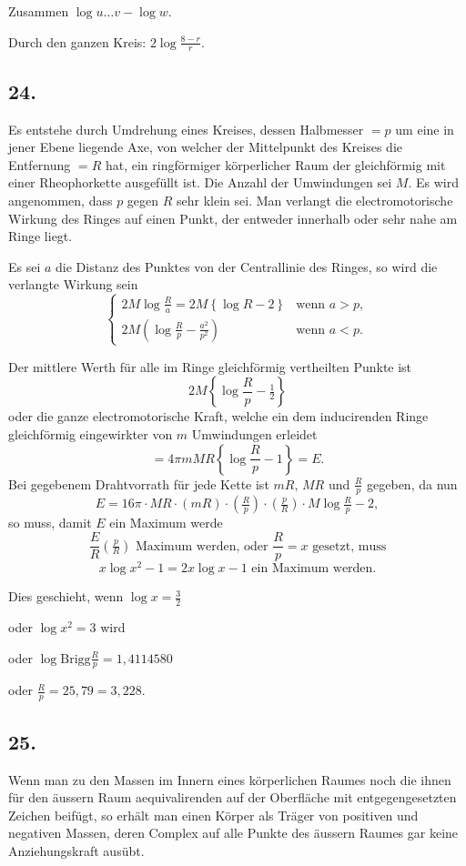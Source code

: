 \documentclass[fontsize=10pt,paper=a5,pagesize=auto]{scrbook}
\newcommand{\origpage}[1]{\marginpar{\footnotesize\textit{S. #1}}}
\begin{document}
Zusammen $\log u \dots v - \log w$.

Durch den ganzen Kreis: $2\log \frac{8 - r}{r}$.

\subsection*{24.}
\origpage{625}
Es entstehe durch Umdrehung eines Kreises, dessen Halbmesser $= p$ um eine in jener Ebene liegende Axe, von welcher der Mittelpunkt des Kreises die Entfernung $= R$ hat, ein ringförmiger körperlicher Raum der gleichförmig mit einer Rheophorkette ausgefüllt ist. Die Anzahl der Umwindungen sei $M$. Es wird angenommen, dass $p$ gegen $R$ sehr klein sei. Man verlangt die electromotorische Wirkung des Ringes auf einen Punkt, der entweder innerhalb oder sehr nahe am Ringe liegt.

Es sei $a$ die Distanz des Punktes von der Centrallinie des Ringes, so wird die verlangte Wirkung sein
\[
\begin{cases}
2M \log \frac{R}{a} = 2M \left\{ \log R - 2 \right\} & \text{wenn } a > p,\\[6pt]
2M \left( \log \frac{R}{p} - \frac{a^2}{p^2} \right) & \text{wenn } a < p.
\end{cases}
\]

\origpage{626}
Der mittlere Werth für alle im Ringe gleichförmig vertheilten Punkte ist
\[
2M \left\{ \log \frac{R}{p} - \tfrac{1}{2} \right\}
\]
oder die ganze electromotorische Kraft, welche ein dem inducirenden Ringe gleichförmig eingewirkter von $m$ Umwindungen erleidet
\[
= 4\pi m M R \left\{ \log \frac{R}{p} - 1 \right\} = E.
\]
Bei gegebenem Drahtvorrath für jede Kette ist $mR$, $MR$ und $\frac{R}{p}$ gegeben, da nun
\[
E = 16\pi \cdot MR \cdot (mR) \cdot \left(\tfrac{R}{p}\right) \cdot \left(\tfrac{p}{R}\right) \cdot M \log \tfrac{R}{p} - 2,
\]
so muss, damit $E$ ein Maximum werde
\[
\frac{E}{R} \left(\tfrac{p}{R}\right) \text{ Maximum werden, oder } \frac{R}{p} = x \text{ gesetzt, muss}
\]
\[
x \log x^2 - 1 = 2x \log x - 1 \text{ ein Maximum werden.}
\]

Dies geschieht, wenn $\log x = \tfrac{3}{2}$

oder $\log x^2 = 3$ wird

oder $\log \mathrm{Brigg} \frac{R}{p} = 1{,}4114580$

oder $\frac{R}{p} = 25{,}79 = 3{,}228$.

\subsection*{25.}
\origpage{627}
Wenn man zu den Massen im Innern eines körperlichen Raumes noch die ihnen für den äussern Raum aequivalirenden auf der Oberfläche mit entgegengesetzten Zeichen beifügt, so erhält man einen Körper als Träger von positiven und negativen Massen, deren Complex auf alle Punkte des äussern Raumes gar keine Anziehungskraft ausübt.
\end{document}
